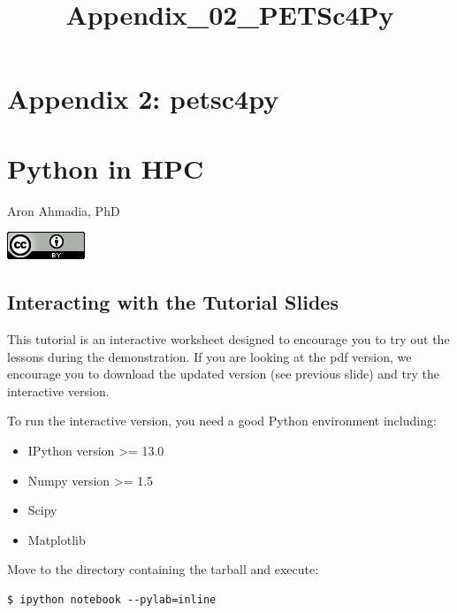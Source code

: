 \documentclass{article}
\title{Appendix\_02\_PETSc4Py}
\begin{document}
    
    
    \maketitle
    
    

    
    \section{Appendix 2: petsc4py}\label{appendix-2-petsc4py}

\section{Python in HPC}\label{python-in-hpc}


Aron Ahmadia, PhD

\href{http://creativecommons.org/licenses/by/3.0/deed.en_US}{\includegraphics{../figures/creative_commons_logo.png}}

\subsection{Interacting with the Tutorial
Slides}\label{interacting-with-the-tutorial-slides}

This tutorial is an interactive worksheet designed to encourage you to
try out the lessons during the demonstration. If you are looking at the
pdf version, we encourage you to download the updated version (see
previous slide) and try the interactive version.

To run the interactive version, you need a good Python environment
including:

\begin{itemize}
\itemsep1pt\parskip0pt
\item
  IPython version \textgreater{}= 13.0
\item
  Numpy version \textgreater{}= 1.5
\item
  Scipy
\item
  Matplotlib
\end{itemize}

Move to the directory containing the tarball and execute:

\begin{verbatim}
$ ipython notebook --pylab=inline
\end{verbatim}
\end{document}
